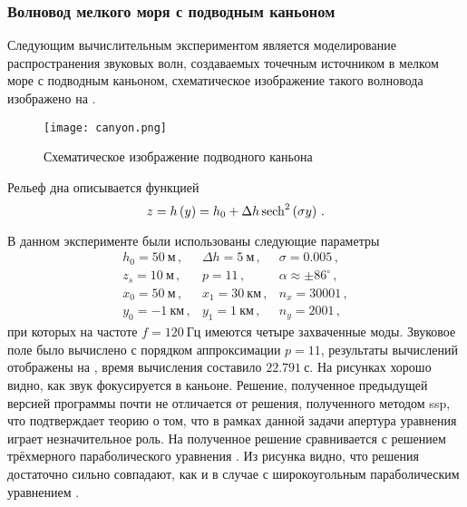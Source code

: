 \documentclass[../document.tex]{subfiles}
\begin{document}
            \subsubsection{Волновод мелкого моря с подводным каньоном}
                \par Следующим вычислительным экспериментом является моделирование распространения звуковых волн, создаваемых точечным источником в мелком море с подводным каньоном, схематическое изображение такого волновода изображено на .
                \begin{figure}[h]
                    \centering
                    \texttt{[image: canyon.png]}
                    \caption{Схематическое изображение подводного каньона\label{fig::canyon}}
                \end{figure}
                Рельеф дна описывается функцией
                \begin{equation}
                    z=h\left(y\right)=h_0+\Delta h\operatorname{sech}^2\left(\sigma y\right)\,.
                \end{equation}
                \par В данном эксперименте были использованы следующие параметры
                \begin{equation}
                    \begin{array}{ccc}
                        h_0=50\ \text{м}\,, & \Delta h=5\ \text{м}\,, & \sigma=0.005\,,\\
                        z_s=10\ \text{м}\,, & p=11\,, & \alpha\approx\pm86^\circ\,,\\
                        x_0=50\ \text{м}\,, & x_1=30\ \text{км}\,, & n_x=30001\,,\\
                        y_0=-1\ \text{км}\,, & y_1=1\ \text{км}\,, & n_y=2001\,,
                    \end{array}
                \end{equation}
                при которых на частоте $f=120\ \text{Гц}$ имеются четыре захваченные моды. Звуковое поле было вычислено с порядком аппроксимации $p=11$, результаты вычислений отображены на , время вычисления составило $22.791\ \text{с}$. На рисунках хорошо видно, как звук фокусируется в каньоне. Решение, полученное предыдущей версией программы почти не отличается от решения, полученного методом \acrshort{ssp}, что подтверждает теорию о том, что в рамках данной задачи апертура уравнения играет незначительное роль. На  полученное решение сравнивается с решением трёхмерного параболического уравнения \cite{isakson14,lin12,shtrum16}. Из рисунка видно, что решения достаточно сильно совпадают, как и в случае с широкоугольным параболическим уравнением \cite{bachelor}.
\end{document}
